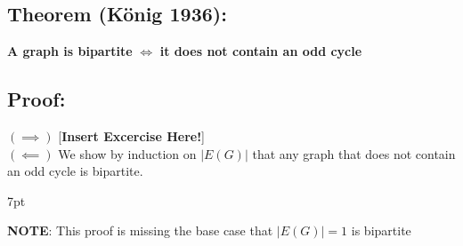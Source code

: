 \documentclass{article}
\newenvironment{formal}{%
  \def\FrameCommand{%
    \hspace{1pt}%
    {\color{black}\vrule width 2pt}%
    {\color{formalshade}\vrule width 4pt}%
    \colorbox{formalshade}%
  }%
  \MakeFramed{\advance\hsize-\width\FrameRestore}%
  \noindent\hspace{-4.55pt}%
  \begin{adjustwidth}{}{7pt}%
  \vspace{2pt}\vspace{2pt}%
}
{%
  \vspace{2pt}\end{adjustwidth}\endMakeFramed%
}
\begin{document}
\subsection{Theorem (König 1936):}
\textbf{A graph is bipartite} $\iff$ \textbf{it does not contain an odd cycle}

\subsection{Proof:}
$(\implies)$ [\textbf{Insert Excercise Here!}] \\
$(\impliedby)$ We show by induction on $|E(G)|$ that any graph that does not contain an odd cycle is bipartite.

\begin{formal}
    \textbf{NOTE}: This proof is missing the base case that $|E(G)| = 1$ is bipartite
\end{formal}
\end{document}
